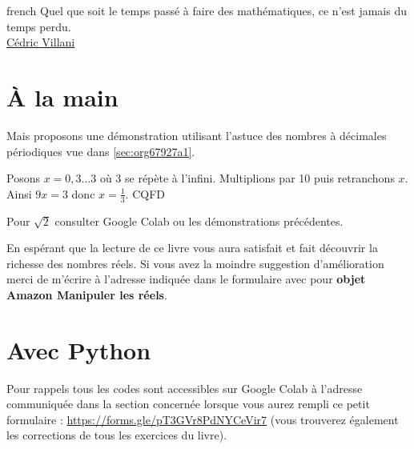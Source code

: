 \documentclass[a4paper, 11pt, twoside]{book}
\begin{document}
\begin{foreigndisplayquote}{french}
Quel que soit le temps passé à faire des mathématiques, ce n'est
jamais du temps perdu.\\

\href{https://fr.wikipedia.org/wiki/C\%C3\%A9dric\_Villani}{Cédric Villani}
\end{foreigndisplayquote}

\section{À la main}
\label{sec:orgcc94390}

Mais proposons une démonstration utilisant l'astuce des nombres à
décimales périodiques vue dans \ref{sec:org67927a1}.

Posons \(x = 0,3\dots 3\) où 3 se répète à l'infini. Multiplions par
10 puis retranchons \(x\). Ainsi \(9x = 3\) donc \(x = \frac{1}{3}\). CQFD

Pour \(\sqrt{2}\) consulter Google Colab ou les démonstrations
précédentes.

En espérant que la lecture de ce livre vous aura satisfait et fait
découvrir la richesse des nombres réels. Si vous avez la moindre
suggestion d'amélioration merci de m'écrire à l'adresse
indiquée dans le formulaire avec pour \textbf{objet Amazon Manipuler les réels}.

\section{Avec Python}
\label{sec:orge021a52}

Pour rappels tous les codes sont accessibles sur Google Colab à
l'adresse communiquée dans la section concernée lorsque vous
aurez rempli ce petit formulaire :
\url{https://forms.gle/pT3GVr8PdNYCeVir7} (vous trouverez également
les corrections de tous les exercices du livre).
\end{document}
